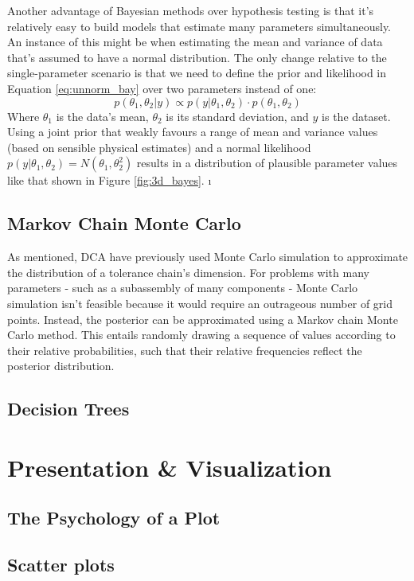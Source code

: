 \documentclass[11pt,a4paper,article]{memoir} %
\begin{document}
Another advantage of Bayesian methods over hypothesis testing is that it's relatively easy to build models that estimate many parameters simultaneously. An instance of this might be when estimating the mean and variance of data that's assumed to have a normal distribution. The only change relative to the single-parameter scenario is that we need to define the prior and likelihood in Equation \ref{eq:unnorm_bay} over two parameters instead of one:
\begin{equation}
	p(\theta_1, \theta_2 | y) \propto p(y|\theta_1, \theta_2) \cdot p(\theta_1, \theta_2)
\end{equation}
Where $\theta_1$ is the data's mean, $\theta_2$ is its standard deviation, and $y$ is the dataset. Using a joint prior that weakly favours a range of mean and variance values (based on sensible physical estimates) and a normal likelihood $p(y|\theta_1, \theta_2) = N(\theta_1, \theta_2^2)$ results in a distribution of plausible parameter values like that shown in Figure \ref{fig:3d_bayes}.
\i

\subsection*{Markov Chain Monte Carlo}
As mentioned, DCA have previously used Monte Carlo simulation to approximate the distribution of a tolerance chain's dimension. For problems with many parameters - such as a subassembly of many components - Monte Carlo simulation isn't feasible because it would require an outrageous number of grid points. Instead, the posterior can be approximated using a Markov chain Monte Carlo method. This entails randomly drawing a sequence of values according to their relative probabilities, such that their relative frequencies reflect the posterior distribution.
\subsection*{Decision Trees}

\section{Presentation \& Visualization}
\subsection{The Psychology of a Plot}
\subsection{Scatter plots}
\end{document}
